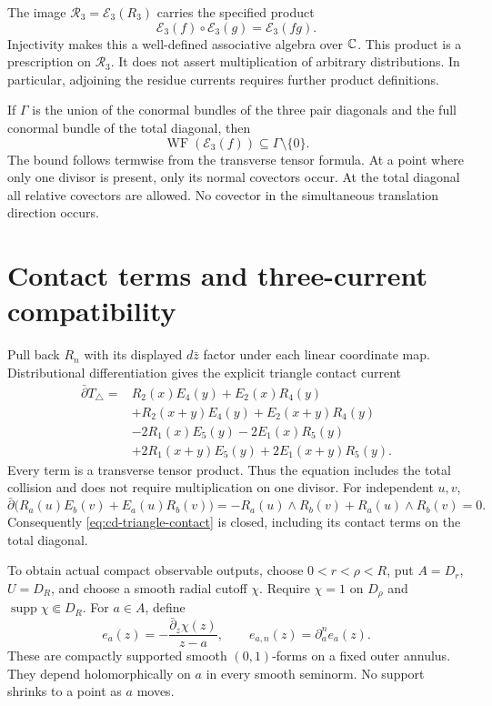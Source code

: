 The image $\mathscr R_3=\mathcal E_3(R_3)$ carries the specified product
\begin{equation}
 \label{eq:cd-renormalized-product}
 \mathcal E_3(f)\mathbin{\circ}\mathcal E_3(g)=\mathcal E_3(fg).
\end{equation}
Injectivity makes this a well-defined associative algebra over $\mathbb C$.
This product is a prescription on $\mathscr R_3$.  It does not assert
multiplication of arbitrary distributions.  In particular, adjoining the
residue currents requires further product definitions.

If $\Gamma$ is the union of the conormal bundles of the three pair diagonals
and the full conormal bundle of the total diagonal, then
\[
 \operatorname{WF}(\mathcal E_3(f))\subseteq\Gamma\setminus\{0\}.
\]
The bound follows termwise from the transverse tensor formula.
At a point where only one divisor is present, only its normal covectors
occur.  At the total diagonal all relative covectors are allowed.
No covector in the simultaneous translation direction occurs.

\section{Contact terms and three-current compatibility}

Pull back $R_n$ with its displayed $d\bar z$ factor under each linear
coordinate map.  Distributional differentiation gives the explicit triangle
contact current
\begin{equation}
 \label{eq:cd-triangle-contact}
 \begin{split}
 \bar\partial T_\triangle={}&R_2(x)E_4(y)+E_2(x)R_4(y)\\
 &+R_2(x+y)E_4(y)+E_2(x+y)R_4(y)\\
 &-2R_1(x)E_5(y)-2E_1(x)R_5(y)\\
 &+2R_1(x+y)E_5(y)+2E_1(x+y)R_5(y).
 \end{split}
\end{equation}
Every term is a transverse tensor product.  Thus the equation includes
the total collision and does not require multiplication on one divisor.
For independent $u,v$,
\[
 \bar\partial\bigl(R_a(u)E_b(v)+E_a(u)R_b(v)\bigr)
 =-R_a(u)\wedge R_b(v)+R_a(u)\wedge R_b(v)=0.
\]
Consequently \eqref{eq:cd-triangle-contact} is closed, including its contact
terms on the total diagonal.

To obtain actual compact observable outputs, choose
$0<r<\rho<R$, put $A=D_r$, $U=D_R$, and choose a smooth radial cutoff $\chi$.
Require $\chi=1$ on $D_\rho$ and $\operatorname{supp}\chi\Subset D_R$.
For $a\in A$, define
\[
 e_a(z)=-\frac{\bar\partial_z\chi(z)}{z-a},\qquad
 e_{a,n}(z)=\partial_a^n e_a(z).
\]
These are compactly supported smooth $(0,1)$-forms on a fixed outer annulus.
They depend holomorphically on $a$ in every smooth seminorm.
No support shrinks to a point as $a$ moves.

